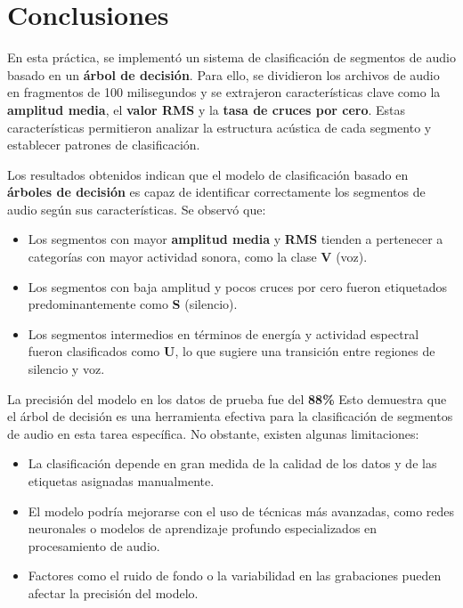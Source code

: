\documentclass{report}
\begin{document}
    


\newpage
\section{Conclusiones}

En esta práctica, se implementó un sistema de clasificación de segmentos de audio basado en un \textbf{árbol de decisión}. Para ello, se dividieron los archivos de audio en fragmentos de 100 milisegundos y se extrajeron características clave como la \textbf{amplitud media}, el \textbf{valor RMS} y la \textbf{tasa de cruces por cero}. Estas características permitieron analizar la estructura acústica de cada segmento y establecer patrones de clasificación.

Los resultados obtenidos indican que el modelo de clasificación basado en \textbf{árboles de decisión} es capaz de identificar correctamente los segmentos de audio según sus características. Se observó que:

\begin{itemize}
    \item Los segmentos con mayor \textbf{amplitud media} y \textbf{RMS} tienden a pertenecer a categorías con mayor actividad sonora, como la clase \textbf{V} (voz).
    \item Los segmentos con baja amplitud y pocos cruces por cero fueron etiquetados predominantemente como \textbf{S} (silencio).
    \item Los segmentos intermedios en términos de energía y actividad espectral fueron clasificados como \textbf{U}, lo que sugiere una transición entre regiones de silencio y voz.
\end{itemize}

La precisión del modelo en los datos de prueba fue del \textbf{88\%} Esto demuestra que el árbol de decisión es una herramienta efectiva para la clasificación de segmentos de audio en esta tarea específica. No obstante, existen algunas limitaciones:

\begin{itemize}
    \item La clasificación depende en gran medida de la calidad de los datos y de las etiquetas asignadas manualmente.
    \item El modelo podría mejorarse con el uso de técnicas más avanzadas, como redes neuronales o modelos de aprendizaje profundo especializados en procesamiento de audio.
    \item Factores como el ruido de fondo o la variabilidad en las grabaciones pueden afectar la precisión del modelo.
\end{itemize}
\end{document}
